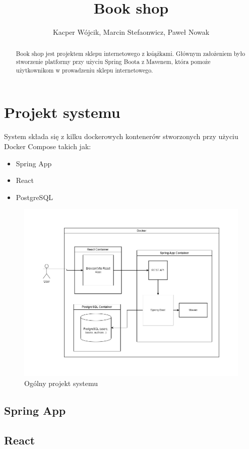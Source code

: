 \documentclass[]{article}
\title{Book shop}
\author{Kacper Wójcik, Marcin Stefaonwicz, Paweł Nowak}
\begin{document}
\maketitle

\begin{abstract}
	Book shop jest projektem sklepu internetowego z książkami. Głównym założeniem było stworzenie platformy przy użyciu Spring Boota z Mavenem, która pomoże użytkownikom w prowadzeniu sklepu internetowego.

\end{abstract}
\newpage

\section{Projekt systemu}
System składa się z kilku dockerowych kontenerów stworzonych przy użyciu Docker Compose takich jak:
\begin{itemize}
	\item Spring App
	\item React
	\item PostgreSQL
\end{itemize}
\begin{figure}[h]
	\centering
	\includegraphics[scale=0.45]{ogolny_projekt.png}
	\caption{Ogólny projekt systemu}
\end{figure}
\subsection{Spring App}
\subsection{React}
\end{document}
